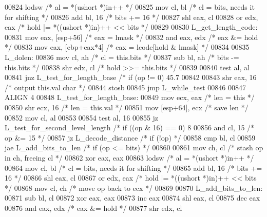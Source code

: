 \begin{DoxyCode}
{{{{{{{{{{{{{{{{{{{{{{{{{{{{{{{{{{{{{{{{{{{{{{{{{{{{{{{{{{{{{{{{{{{{{{{{{{{{{{{{{{{{{{{{{{{{{{{{{{{{{{{{{{{{{{{{{{{{{{{{{{{{{{{{{{{{{{{{{{{{{{{{{{{{{{{{{{{{{{{{{{{{{{{{{{{{{{{{{{{{{{{{{{{{{{{{{{{{{{{{{{{{{{{{{{{{{{{{{{{{{{{{{{{{{{{{{{{{{{{{{{{{{{{{{{{{{{{{{{{{{{{{{{{{{{{{{{{{{{{{{{{{{{{{{{{{{{{{{{{{{{{{{{{{{{{{{{{{{{{{{{{{{{{{{{{{{{{{{{{{{{{{{{{{{{{{{{{{{{{{{00824     lodsw                         \textcolor{comment}{/* al = *(ushort *)in++ */}
00825     mov cl, bl            \textcolor{comment}{/* cl = bits, needs it for shifting */}
00826     add bl, 16             \textcolor{comment}{/* bits += 16 */}
00827     shl eax, cl
00828     or  edx, eax        \textcolor{comment}{/* hold |= *((ushort *)in)++ << bits */}
00829 
00830 L\_get\_length\_code:
00831     mov eax, [esp+56]      \textcolor{comment}{/* eax = lmask */}
00832     and eax, edx          \textcolor{comment}{/* eax &= hold */}
00833     mov eax, [ebp+eax*4] \textcolor{comment}{/* eax = lcode[hold & lmask] */}
00834 
00835 L\_dolen:
00836     mov cl, ah            \textcolor{comment}{/* cl = this.bits */}
00837     sub bl, ah            \textcolor{comment}{/* bits -= this.bits */}
00838     shr edx, cl           \textcolor{comment}{/* hold >>= this.bits */}
00839 
00840     test    al, al
00841     jnz L\_test\_for\_length\_base \textcolor{comment}{/* if (op != 0) 45.7%
00842 
00843     shr eax, 16            \textcolor{comment}{/* output this.val char */}
00844     stosb
00845     jmp L\_while\_test
00846 
00847 ALIGN 4
00848 L\_test\_for\_length\_base:
00849     mov ecx, eax          \textcolor{comment}{/* len = this */}
00850     shr ecx, 16            \textcolor{comment}{/* len = this.val */}
00851     mov [esp+64], ecx      \textcolor{comment}{/* save len */}
00852     mov cl, al
00853 
00854     test    al, 16
00855     jz  L\_test\_for\_second\_level\_length \textcolor{comment}{/* if ((op & 16) == 0) 8%
00856     and cl, 15             \textcolor{comment}{/* op &= 15 */}
00857     jz  L\_decode\_distance    \textcolor{comment}{/* if (!op) */}
00858     cmp bl, cl
00859     jae L\_add\_bits\_to\_len    \textcolor{comment}{/* if (op <= bits) */}
00860 
00861     mov ch, cl            \textcolor{comment}{/* stash op in ch, freeing cl */}
00862     xor eax, eax
00863     lodsw                         \textcolor{comment}{/* al = *(ushort *)in++ */}
00864     mov cl, bl            \textcolor{comment}{/* cl = bits, needs it for shifting */}
00865     add bl, 16             \textcolor{comment}{/* bits += 16 */}
00866     shl eax, cl
00867     or  edx, eax         \textcolor{comment}{/* hold |= *((ushort *)in)++ << bits */}
00868     mov cl, ch            \textcolor{comment}{/* move op back to ecx */}
00869 
00870 L\_add\_bits\_to\_len:
00871     sub bl, cl
00872     xor eax, eax
00873     inc eax
00874     shl eax, cl
00875     dec eax
00876     and eax, edx          \textcolor{comment}{/* eax &= hold */}
00877     shr edx, cl
}}}}}}}}}}}}}}}}}}}}}}}}}}}}}}}}}}}}}}}}}}}}}}}}}}}}}}}}}}}}}}}}}}}}}}}}}}}}}}}}}}}}}}}}}}}}}}}}}}}}}}}}}}}}}}}}}}}}}}}}}}}}}}}}}}}}}}}}}}}}}}}}}}}}}}}}}}}}}}}}}}}}}}}}}}}}}}}}}}}}}}}}}}}}}}}}}}}}}}}}}}}}}}}}}}}}}}}}}}}}}}}}}}}}}}}}}}}}}}}}}}}}}}}}}}}}}}}}}}}}}}}}}}}}}}}}}}}}}}}}}}}}}}}}}}}}}}}}}}}}}}}}}}}}}}}}}}}}}}}}}}}}}}}}}}}}}}}}}}}}}}}}}}}}}}}}}}}}}}}}}}}
\end{DoxyCode}
